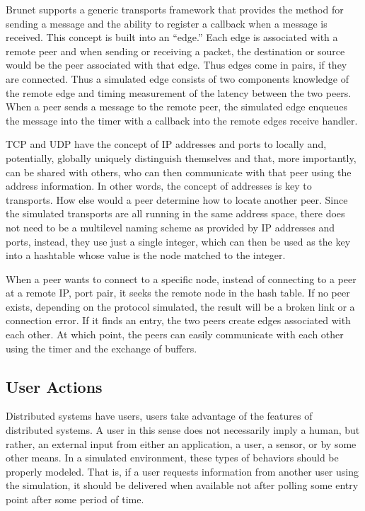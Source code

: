 Brunet supports a generic transports framework that provides the method for
sending a message and the ability to register a callback when a message is
received.  This concept is built into an ``edge.''  Each edge is associated
with a remote peer and when sending or receiving a packet, the destination or
source would be the peer associated with that edge.  Thus edges come in pairs,
if they are connected.  Thus a simulated edge consists of two components
knowledge of the remote edge and timing measurement of the latency between the
two peers.  When a peer sends a message to the remote peer, the simulated edge
enqueues the message into the timer with a callback into the remote edges
receive handler.

TCP and UDP have the concept of IP addresses and ports to locally and,
potentially, globally uniquely distinguish themselves and that, more
importantly, can be shared with others, who can then communicate with that peer
using the address information.  In other words, the concept of addresses is key
to transports.  How else would a peer determine how to locate another peer.
Since the simulated transports are all running in the same address space, there
does not need to be a multilevel naming scheme as provided by IP addresses and
ports, instead, they use just a single integer, which can then be used as the
key into a hashtable whose value is the node matched to the integer.

When a peer wants to connect to a specific node, instead of connecting to a
peer at a remote IP, port pair, it seeks the remote node in the hash table.  If
no peer exists, depending on the protocol simulated, the result will be a
broken link or a connection error.  If it finds an entry, the two peers create
edges associated with each other.  At which point, the peers can easily
communicate with each other using the timer and the exchange of buffers.

\subsection{User Actions}

Distributed systems have users, users take advantage of the features of
distributed systems.  A user in this sense does not necessarily imply a human,
but rather, an external input from either an application, a user, a sensor, or
by some other means.  In a simulated environment, these types of behaviors
should be properly modeled.  That is, if a user requests information from
another user using the simulation, it should be delivered when available not
after polling some entry point after some period of time.


